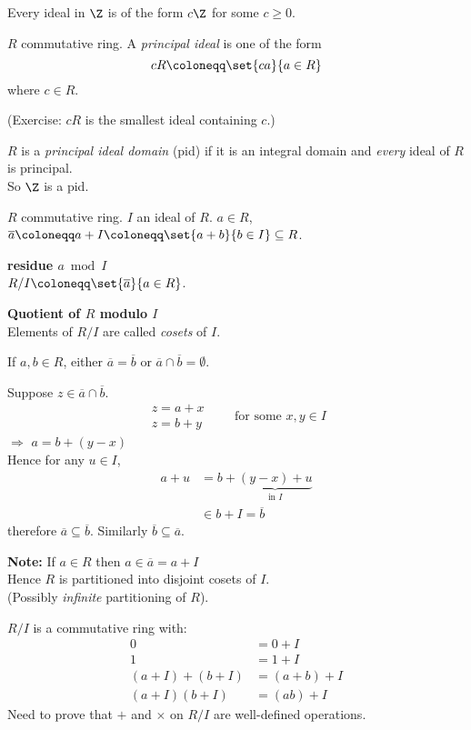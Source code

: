 Every ideal in $\Z$ is of the form $c\Z$ for some $c\geq0$.

 $R$ commutative ring.  A \emph{principal ideal} is one of the form
\[ cR \coloneqq \set{ca}{a\in R} \]
where $c\in R$.

(Exercise: $cR$ is the smallest ideal containing $c$.)

$R$ is a \emph{principal ideal domain} (pid) if it is an integral domain and \emph{every} ideal of $R$ is principal. \\
So $\Z$ is a pid.

$R$ commutative ring.  $I$ an ideal of $R$.  $a\in R$, $\overline{a}\coloneqq a+I\coloneqq\set{a+b}{b\in I}\subseteq R$.

\textbf{residue $a\bmod I$} \\
$R/I \coloneqq \set{\overline a}{a\in R}$.

\textbf{Quotient of $R$ modulo $I$} \\
Elements of $R/I$ are called \emph{cosets} of $I$.

\lem If $a,b\in R$, either $\overline a=\overline b$ or ${\overline a}\cap{\overline b}=\emptyset$.

\pf Suppose $z\in\overline a\cap\overline b$.
\[ \begin{gathered}
z = a + x \\
z = b + y
\end{gathered} \qquad\text{for some $x,y\in I$} \]
$\Longrightarrow$ $a=b+(y-x)$ \\
Hence for any $u\in I$,
\begin{align*}
a + u &= b + \underbrace{(y-x) + u}_{\text{in $I$}} \\
&\in b + I = \overline b
\end{align*}
therefore $\overline a\subseteq\overline b$.  Similarly $\overline b\subseteq\overline a$.

\textbf{Note:} If $a\in R$ then $a\in\overline a = a + I$ \\
Hence $R$ is partitioned into disjoint cosets of $I$.%
\\ (Possibly \emph{infinite} partitioning of $R$).

\prop $R/I$ is a commutative ring with:
\begin{align*}
0 &= 0 + I \\
1 &= 1 + I \\
(a+I) + (b+I) &= (a+b) + I \\
(a+I)(b+I) &= (ab)+I
\end{align*}
\pf Need to prove that $+$ and $\times$ on $R/I$ are well-defined operations.

